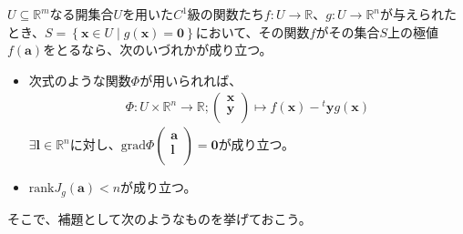 \documentclass[dvipdfmx]{jsarticle}
\begin{document}
\begin{thm*}
$U \subseteq \mathbb{R}^{m}$なる開集合$U$を用いた$C^{1}$級の関数たち$f:U \rightarrow \mathbb{R}$、$g:U \rightarrow \mathbb{R}^{n}$が与えられたとき、$S = \left\{ \mathbf{x} \in U \middle| g\left( \mathbf{x} \right) = \mathbf{0} \right\}$において、その関数$f$がその集合$S$上の極値$f\left( \mathbf{a} \right)$をとるなら、次のいづれかが成り立つ。
\begin{itemize}
\item
  次式のような関数$\varPhi$が用いられれば、
\begin{align*}
\varPhi:U \times \mathbb{R}^{n} \rightarrow \mathbb{R};\begin{pmatrix}
\mathbf{x} \\
\mathbf{y} \\
\end{pmatrix} \mapsto f\left( \mathbf{x} \right) -{}^t \mathbf{y}g\left( \mathbf{x} \right)
\end{align*}
$\exists\mathbf{l} \in \mathbb{R}^{n}$に対し、$\mathrm{grad}\varPhi\begin{pmatrix}
\mathbf{a} \\
\mathbf{l} \\
\end{pmatrix} = \mathbf{0}$が成り立つ。
\item
  $\mathrm{rank}{J_{g}\left( \mathbf{a} \right)} < n$が成り立つ。
\end{itemize}
\end{thm*}\par
そこで、補題として次のようなものを挙げておこう。
\end{document}
